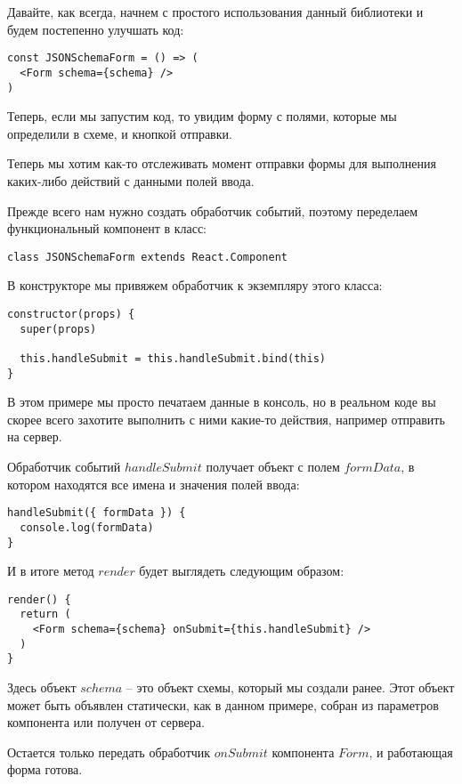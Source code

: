 Давайте, как всегда, начнем с простого использования данный библиотеки и будем постепенно улучшать код:

\begin{lstlisting}
const JSONSchemaForm = () => (
  <Form schema={schema} />
)
\end{lstlisting}

Теперь, если мы запустим код, то увидим форму с полями, которые мы определили в схеме, и кнопкой отправки.

Теперь мы хотим как-то отслеживать момент отправки формы для выполнения каких-либо действий с данными полей ввода.

Прежде всего нам нужно создать обработчик событий, поэтому переделаем функциональный компонент в класс:

\begin{lstlisting}
class JSONSchemaForm extends React.Component
\end{lstlisting}

В конструкторе мы привяжем обработчик к экземпляру этого класса:

\begin{lstlisting}
constructor(props) {
  super(props)
  
  this.handleSubmit = this.handleSubmit.bind(this)
}
\end{lstlisting}

В этом примере мы просто печатаем данные в консоль, но в реальном коде вы скорее всего захотите выполнить с ними какие-то действия, например отправить на сервер.

Обработчик событий $handleSubmit$ получает объект с полем $formData$, в котором находятся все имена и значения полей ввода:

\begin{lstlisting}
handleSubmit({ formData }) {
  console.log(formData)
}
\end{lstlisting}

И в итоге метод $render$ будет выглядеть следующим образом:

\begin{lstlisting}
render() {
  return (
    <Form schema={schema} onSubmit={this.handleSubmit} />
  )
}
\end{lstlisting}

Здесь объект $schema$ -- это объект схемы, который мы создали ранее. Этот объект может быть объявлен статически, как в данном примере, собран из параметров компонента или получен от сервера.

Остается только передать обработчик $onSubmit$ компонента $Form$, и работающая форма готова.

